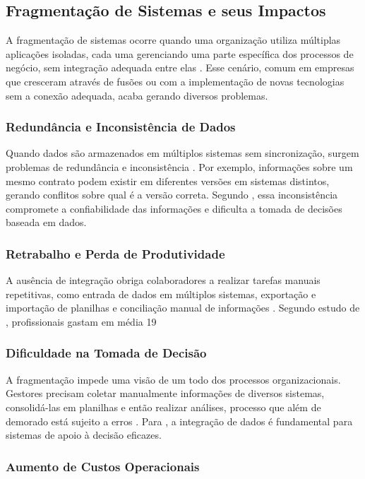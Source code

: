 \subsection{Fragmentação de Sistemas e seus Impactos}
A fragmentação de sistemas ocorre quando uma organização utiliza múltiplas aplicações isoladas, cada uma gerenciando uma parte específica dos processos de negócio, sem integração adequada entre elas \cite{laudon2020}.
Esse cenário, comum em empresas que cresceram através de fusões ou com a implementação de novas tecnologias sem a conexão adequada, acaba gerando diversos problemas.
\subsubsection{Redundância e Inconsistência de Dados}

Quando dados são armazenados em múltiplos sistemas sem sincronização, surgem problemas de redundância e inconsistência \cite{elmasri2016}. Por exemplo, informações sobre um mesmo contrato podem existir em diferentes versões em sistemas distintos, gerando conflitos sobre qual é a versão correta. Segundo \cite{davenport2018}, essa inconsistência compromete a confiabilidade das informações e dificulta a tomada de decisões baseada em dados.
\subsubsection{Retrabalho e Perda de Produtividade}
A ausência de integração obriga colaboradores a realizar tarefas manuais repetitivas, como entrada de dados em múltiplos sistemas, exportação e importação de planilhas e conciliação manual de informações \cite{stair2018}. Segundo estudo de \cite{mckinsey2018}, profissionais gastam em média 19%
\subsubsection{Dificuldade na Tomada de Decisão}
A fragmentação impede uma visão de um todo dos processos organizacionais. Gestores precisam coletar manualmente informações de diversos sistemas, consolidá-las em planilhas e então realizar análises, processo que além de demorado está sujeito a erros \cite{power2002}. Para \cite{sharda2014}, a integração de dados é fundamental para sistemas de apoio à decisão eficazes.
\subsubsection{Aumento de Custos Operacionais}

